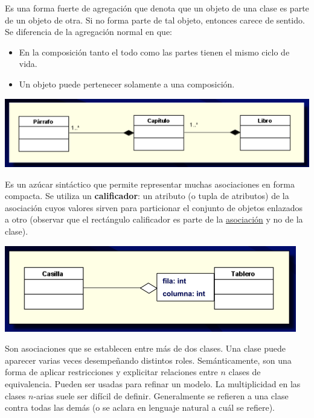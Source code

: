 \documentclass[]{article}
\begin{document}
Es una forma fuerte de agregación que denota que un objeto de una clase es parte de un objeto de otra. Si no forma parte de tal objeto, entonces carece de sentido. Se diferencia de la agregación normal en que:
\begin{itemize}
	\item En la composición tanto el todo como las partes tienen el mismo ciclo de vida.
	\item Un objeto puede pertenecer solamente a una composición.
\end{itemize}

\begin{center}
	\includegraphics[scale=0.6]{Composicion.png}
\end{center}

Es un azúcar sintáctico que permite representar muchas asociaciones en forma compacta. Se utiliza un \textbf{calificador}: un atributo (o tupla de atributos) de la asociación cuyos valores sirven para particionar el conjunto de objetos enlazados a otro (observar que el rectángulo calificador es parte de la \underline{asociación} y no de la clase).

\begin{center}
	\includegraphics[scale=0.6]{AsoCalificada.png}
\end{center}

Son asociaciones que se establecen entre más de dos clases. Una clase puede aparecer varias veces desempeñando distintos roles. Semánticamente, son una forma de aplicar restricciones y explicitar relaciones entre $n$ clases de equivalencia. Pueden ser usadas para refinar un modelo. La multiplicidad en las clases $n$-arias suele ser difícil de definir. Generalmente se refieren a una clase contra todas las demás (o se aclara en lenguaje natural a cuál se refiere).
\end{document}
